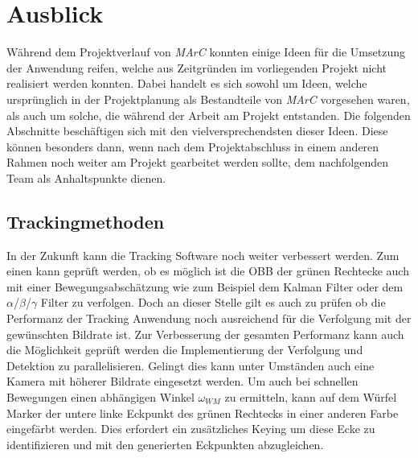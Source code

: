 \section{Ausblick}\label{sec:ausblick}
Während dem Projektverlauf von \emph{MArC} konnten einige Ideen für die Umsetzung der Anwendung reifen, welche aus Zeitgründen im vorliegenden Projekt nicht realisiert werden konnten. Dabei handelt es sich sowohl um Ideen, welche ursprünglich in der Projektplanung als Bestandteile von \emph{MArC} vorgesehen waren, als auch um solche, die während der Arbeit am Projekt entstanden. Die folgenden Abschnitte beschäftigen sich mit den vielversprechendsten dieser Ideen. Diese können besonders dann, wenn nach dem Projektabschluss in einem anderen Rahmen noch weiter am Projekt gearbeitet werden sollte, dem nachfolgenden Team als Anhaltspunkte dienen.
\subsection{Trackingmethoden}
In der Zukunft kann die Tracking Software noch weiter verbessert werden. Zum einen kann geprüft werden, ob es möglich ist die OBB der grünen Rechtecke auch mit einer Bewegungsabschätzung wie zum Beispiel dem Kalman Filter \cite{article:Kalman} oder dem $\alpha$/$\beta$/$\gamma$ Filter \cite{article:alphabetagamma} zu verfolgen. Doch an dieser Stelle gilt es auch zu prüfen ob die Performanz der Tracking Anwendung noch ausreichend für die Verfolgung mit der gewünschten Bildrate ist. Zur Verbesserung der gesamten Performanz kann auch die Möglichkeit geprüft werden die Implementierung der Verfolgung und Detektion zu parallelisieren. Gelingt dies kann unter Umständen auch eine Kamera mit höherer Bildrate eingesetzt werden.
Um auch bei schnellen Bewegungen einen abhängigen Winkel $\omega_{WM}$ zu ermitteln, kann auf dem Würfel Marker der untere linke Eckpunkt des grünen Rechtecks in einer anderen Farbe eingefärbt werden. Dies erfordert ein zusätzliches Keying um diese Ecke zu identifizieren und mit den generierten Eckpunkten abzugleichen.

